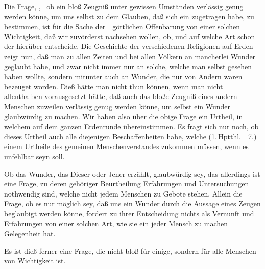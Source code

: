 \begin{aufza}
\item  Die Frage, , \dh\ ob ein bloß  Zeugniß unter gewissen Umständen verlässig genug werden könne, um uns selbst zu dem Glauben, daß sich ein  zugetragen habe, zu bestimmen, ist für die Sache der~\ göttlichen Offenbarung von einer solchen Wichtigkeit, daß wir zuvörderst nachsehen wollen, ob, und auf welche Art schon der  hierüber entscheide. Die Geschichte der verschiedenen Religionen auf Erden zeigt nun, daß man zu allen Zeiten und bei allen Völkern an mancherlei Wunder geglaubt habe, und zwar nicht immer nur an solche, welche man selbst gesehen haben wollte, sondern mitunter auch an Wunder, die nur von Andern waren bezeuget worden. Dieß hätte man nicht thun können, wenn man nicht allenthalben vorausgesetzt hätte, daß auch das bloße Zeugniß eines andern Menschen zuweilen verlässig genug werden könne, um selbst ein Wunder glaubwürdig zu machen. Wir haben also über die obige Frage ein Urtheil, in welchem  auf dem ganzen Erdenrunde übereinstimmen. Es fragt sich nur noch, ob dieses Urtheil auch alle diejenigen Beschaffenheiten habe, welche (1.\,Hptthl.\ \ 7.) einem Urtheile des gemeinen Menschenverstandes zukommen müssen, wenn es unfehlbar seyn soll.
\begin{aufzb}
\item  Ob das  Wunder, das Dieser oder Jener erzählt, glaubwürdig sey, das allerdings ist eine Frage, zu deren gehöriger Beurtheilung Erfahrungen und Untersuchungen nothwendig sind, welche nicht jedem Menschen zu Gebote stehen. Allein die Frage, ob es nur  möglich sey, daß uns ein Wunder durch die Aussage eines Zeugen beglaubigt werden könne, fordert zu ihrer Entscheidung nichts als Vernunft und Erfahrungen von einer solchen Art, wie sie ein jeder Mensch zu machen Gelegenheit hat.
\item  Es ist dieß ferner eine Frage, die nicht bloß für einige, sondern für alle Menschen von Wichtigkeit ist.

\end{aufzb}
\end{aufza}
